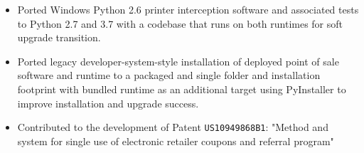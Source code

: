\documentclass[10pt,letter,ragged2e]{altacv}
\begin{document}
\begin{paracol}{2}
\begin{itemize}
\item Ported Windows Python 2.6 printer interception software and associated tests to Python 2.7 and 3.7 with a codebase that runs on both runtimes for soft upgrade transition.
\item Ported legacy developer-system-style installation of deployed point of sale software and runtime to a packaged and single folder and installation footprint with bundled runtime as an additional target using PyInstaller to improve installation and upgrade success.
\item Contributed to the development of Patent \texttt{US10949868B1}: "Method and system for single use of electronic retailer coupons and referral program"

\end{itemize}
\end{paracol}
\end{document}
